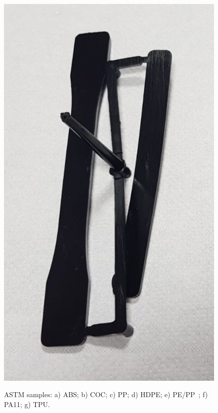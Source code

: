 \documentclass[a4paper, 11pt]{article}
\begin{document}
\begin{figure}[htp]
{\includegraphics[scale=0.27]{TPU}}
\captionsetup{justification=centering}
\caption{ASTM samples: a) ABS; b) COC; c) PP; d) HDPE; e) PE/PP\ ; f) PA11; g) TPU. }
\label{fig:ASTM}
\end{figure}
\end{document}
